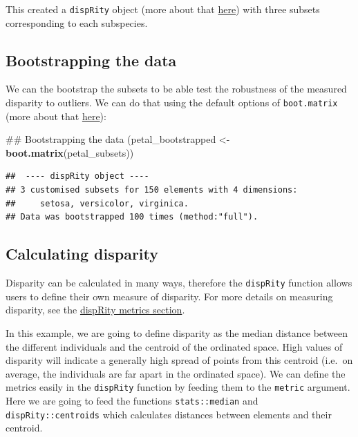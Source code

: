 \documentclass[]{book}
\newenvironment{Shaded}{\begin{snugshade}}{\end{snugshade}}
\newcommand{\KeywordTok}[1]{\textcolor[rgb]{0.13,0.29,0.53}{\textbf{#1}}}
\newcommand{\StringTok}[1]{\textcolor[rgb]{0.31,0.60,0.02}{#1}}
\newcommand{\NormalTok}[1]{#1}
\theoremstyle{definition}
\theoremstyle{definition}
\theoremstyle{definition}
\theoremstyle{remark}
\begin{document}
This created a \texttt{dispRity} object (more about that
\protect\hyperlink{guts}{here}) with three subsets corresponding to each
subspecies.

\subsection{Bootstrapping the data}\label{bootstrapping-the-data-1}

We can the bootstrap the subsets to be able test the robustness of the
measured disparity to outliers. We can do that using the default options
of \texttt{boot.matrix} (more about that
\protect\hyperlink{bootstraps-and-rarefactions}{here}):

\begin{Shaded}
\begin{Highlighting}[]
\NormalTok{## Bootstrapping the data}
\NormalTok{(petal_bootstrapped <-}\StringTok{ }\KeywordTok{boot.matrix}\NormalTok{(petal_subsets))}
\end{Highlighting}
\end{Shaded}

\begin{verbatim}
##  ---- dispRity object ---- 
## 3 customised subsets for 150 elements with 4 dimensions:
##     setosa, versicolor, virginica.
## Data was bootstrapped 100 times (method:"full").
\end{verbatim}

\subsection{Calculating disparity}\label{calculating-disparity-1}

Disparity can be calculated in many ways, therefore the
\texttt{dispRity} function allows users to define their own measure of
disparity. For more details on measuring disparity, see the
\protect\hyperlink{disparity-metrics}{dispRity metrics section}.

In this example, we are going to define disparity as the median distance
between the different individuals and the centroid of the ordinated
space. High values of disparity will indicate a generally high spread of
points from this centroid (i.e.~on average, the individuals are far
apart in the ordinated space). We can define the metrics easily in the
\texttt{dispRity} function by feeding them to the \texttt{metric}
argument. Here we are going to feed the functions \texttt{stats::median}
and \texttt{dispRity::centroids} which calculates distances between
elements and their centroid.
\end{document}
